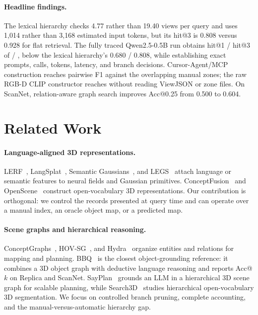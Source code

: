 \documentclass[runningheads]{llncs}
\begin{document}
\paragraph{Headline findings.}
The lexical hierarchy checks 4.77 rather than 19.40 views per query and uses
1,014 rather than 3,168 estimated input tokens, but its hit@3 is 0.808 versus
0.928 for flat retrieval. The fully traced Qwen2.5-0.5B run obtains hit@1 /
hit@3 of \AgentHitOne{} / \AgentHitThree{}, below the lexical hierarchy's
0.680 / 0.808, while establishing exact prompts, calls, tokens, latency, and
branch decisions. Cursor-Agent/MCP construction reaches pairwise F1
\CursorPairwiseFOne{} against the overlapping manual zones; the raw RGB-D CLIP
constructor reaches \RawPairwiseFOne{} without reading ViewJSON or zone files.
On ScanNet, relation-aware graph search improves Acc@0.25 from 0.500 to 0.604.

\section{Related Work}
\paragraph{Language-aligned 3D representations.}
LERF~\cite{kerr2023lerf}, LangSplat~\cite{langsplat2024}, Semantic
Gaussians~\cite{semanticgaussians2024}, and LEGS~\cite{legs2024} attach
language or semantic features to neural fields and Gaussian primitives.
ConceptFusion~\cite{conceptfusion2023} and OpenScene~\cite{openscene2023}
construct open-vocabulary 3D representations. Our contribution is orthogonal:
we control the records presented at query time and can operate over a manual
index, an oracle object map, or a predicted map.

\paragraph{Scene graphs and hierarchical reasoning.}
ConceptGraphs~\cite{gu2023conceptgraphs}, HOV-SG~\cite{hovsg2024}, and
Hydra~\cite{hydra2022} organize entities and relations for mapping and
planning. BBQ~\cite{bbq2024} is the closest object-grounding reference: it
combines a 3D object graph with deductive language reasoning and reports
Acc@$k$ on Replica and ScanNet. SayPlan~\cite{rana2023sayplan} grounds an LLM
in a hierarchical 3D scene graph for scalable planning, while
Search3D~\cite{takmaz2025search3d} studies hierarchical open-vocabulary 3D
segmentation. We focus on controlled branch pruning, complete accounting, and
the manual-versus-automatic hierarchy gap.
\end{document}

